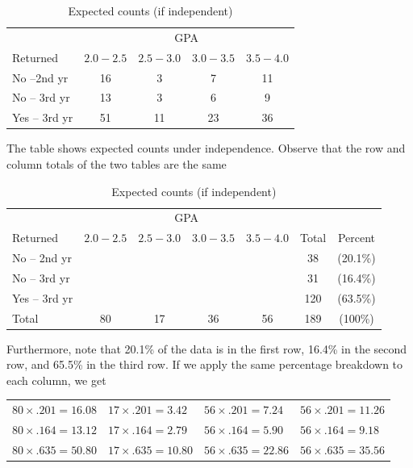 \documentclass[11pt, chapterprefix=true]{scrbook}\usepackage[]{graphicx}\usepackage[]{color}
\begin{document}
\begin{table}[ht]
\centering
\caption{Expected counts (if independent)}
\begin{tabular}{@{} lcccc @{}} \hline
& \multicolumn{4}{c}{GPA} \\
Returned & $2.0-2.5$ & $2.5-3.0$ & $3.0-3.5$ & $3.5-4.0$ \\ \hline
No --2nd yr & 16 & 3 & 7 & 11 \\
No -- 3rd yr & 13 & 3 & 6 & 9 \\
Yes -- 3rd yr & 51 & 11 & 23 & 36 \\ \hline
\end{tabular}
\end{table}

The table shows expected counts under independence.  Observe that the row and column totals of the two tables are the same

\begin{table}[ht]
\centering
\caption{Expected counts (if independent)}
\begin{tabular}{@{} lcccccc @{}} \hline
& \multicolumn{4}{c}{GPA} \\
Returned & $2.0-2.5$ & $2.5-3.0$ & $3.0-3.5$ & $3.5-4.0$ & Total & Percent \\ \hline
No -- 2nd yr &  &  &  &  & 38 & (20.1\%) \\
No -- 3rd yr &  &  &  &  & 31 & (16.4\%)\\
Yes -- 3rd yr &  &  &  &  & 120 & (63.5\%) \\ \hline
Total        & 80 & 17 & 36 & 56 & 189 & (100\%) \\
\end{tabular}
\end{table}

Furthermore, note that 20.1\% of the data is in the first row, 16.4\% in the second row, and 65.5\% in the third row.  If we apply the same percentage breakdown to each column, we get

\begin{table}[ht]
\centering
\begin{tabular}{@{} llll @{}} \hline
$80 \times .201 = 16.08$ & $17 \times .201 = 3.42$ & $56 \times .201 = 7.24$ & $56 \times .201 = 11.26$  \\
$80 \times .164 = 13.12$ & $17 \times .164 = 2.79$ & $56 \times .164 = 5.90$ & $56 \times .164 = 9.18$  \\
$80 \times .635 = 50.80$ & $17 \times .635 = 10.80$ & $56 \times .635 = 22.86$ & $56 \times .635 = 35.56$  \\ \hline
\end{tabular}
\end{table}
\end{document}
